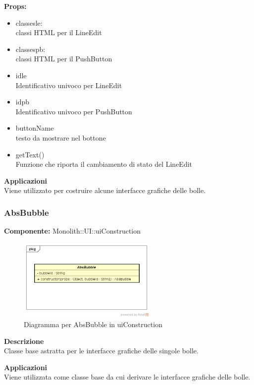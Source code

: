 \textbf{Props:} 
\begin{itemize}
\item classesle: 
\\
classi HTML per il LineEdit
\item classespb: 
\\
classi HTML per il PushButton
\item idle
\\
Identificativo univoco per LineEdit
\item idpb
\\
Identificativo univoco per PushButton
\item buttonName
\\
testo da mostrare nel bottone
\item getText()
\\
Funzione che riporta il cambiamento di stato del LineEdit

\end{itemize} 


\textbf{Applicazioni}\\
Viene utilizzato per costruire alcune interfacce grafiche delle bolle. 


\clearpage

\subsubsection{AbsBubble}
\textbf{Componente:}  Monolith::UI::uiConstruction\\
   \FloatBarrier
   \begin{figure}[ht]
   \centering
   \includegraphics[width=0.6\textwidth]{img/single-AbsBubble.png}
   \caption{{Diagramma per AbsBubble in uiConstruction}}
\end{figure}
\FloatBarrier
\textbf{Descrizione}\\
Classe base astratta per le interfacce grafiche delle singole bolle. 


\textbf{Applicazioni}\\
Viene utilizzata come classe base da cui derivare le interfacce grafiche delle bolle. 


